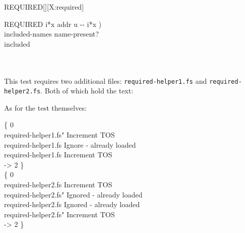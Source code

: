 \begin{worddef}{}{REQUIRED}[][X:required]
\begin{defer}
		\word{:} REQUIRED  i*x addr u -{}- i*x ) \\
		\tab {} included-names  name-present?   \\
		\tab[2] included \\
		\tab {} \\
		\tab[2]  \\
		\tab {} \word{;}

	\testing*
		This test requires two additional files:
			\texttt{required-helper1.fs} and
			\texttt{required-helper2.fs}.
		Both of which hold the text:
		\begin{quote}
		\end{quote}
		As for the test themselves:

		\ttfamily
		\{ 0 \\
		\tab {} required-helper1.fs"   Increment TOS \\
		\tab {} required-helper1.fs				 Ignore - already loaded \\
		\tab {} required-helper1.fs				 Increment TOS \\
		 -> 2 \} \\

		\{ 0 \\
		\tab {} required-helper2.fs				 Increment TOS \\
		\tab {} required-helper2.fs"   Ignored - already loaded \\
		\tab {} required-helper2.fs				 Ignored - already loaded \\
		\tab {} required-helper2.fs" 	 Increment TOS \\
		 -> 2 \}
	\end{defer}
\end{worddef}

